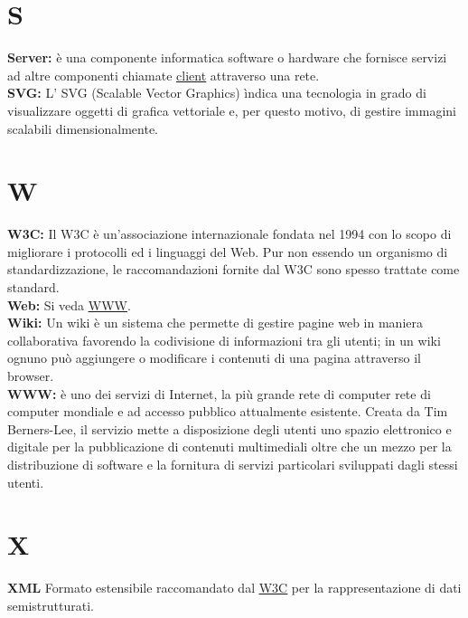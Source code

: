 \section*{S}
\hypertarget{server}{}
\textbf{Server:}
\`e una componente informatica software o hardware che fornisce servizi ad altre componenti chiamate \hyperlink{client}{\underline{client}} attraverso una rete. \\

\hypertarget{svg}{}
\textbf{SVG:}
L' SVG (Scalable Vector Graphics) \` indica una tecnologia in grado di visualizzare oggetti di grafica vettoriale e, per questo motivo, di gestire immagini scalabili dimensionalmente.\\

\section*{W}
\hypertarget{w3c}{}
\textbf{W3C:}
Il W3C \`e un'associazione internazionale fondata nel 1994 con lo scopo di migliorare i protocolli ed i linguaggi del Web. Pur non essendo un organismo di standardizzazione, le raccomandazioni fornite dal W3C sono spesso trattate come standard.\\

\hypertarget{web}{}
\textbf{Web:}
Si veda \hyperlink{www}{\underline{WWW}}.\\

\hypertarget{wiki}{}
\textbf{Wiki:}
Un wiki \`e un sistema che permette di gestire pagine web in maniera collaborativa favorendo la codivisione di informazioni tra gli utenti; in un wiki ognuno pu\`o aggiungere o modificare i contenuti di una pagina attraverso il browser.\\

\hypertarget{www}{}
\textbf{WWW:}
\`e uno dei servizi di Internet, la pi\`u grande rete di computer rete di computer mondiale e ad accesso pubblico attualmente esistente.
Creata da Tim Berners-Lee, il servizio mette a disposizione degli utenti uno spazio elettronico e digitale per la pubblicazione di contenuti multimediali oltre che un mezzo per la distribuzione di software e la fornitura di servizi particolari sviluppati dagli stessi utenti. \\

\section*{X}
\hypertarget{xml}{}
\textbf{XML}
\text Formato estensibile raccomandato dal \hyperlink{w3c}{\underline{W3C}} per la rappresentazione di dati semistrutturati.\\


